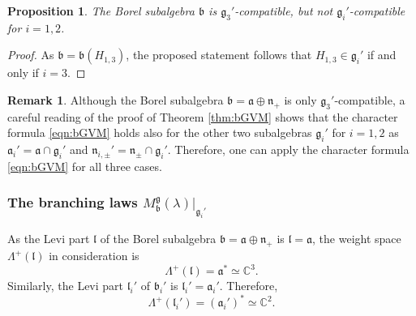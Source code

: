 \documentclass[a4paper,11pt,reqno]{amsart}
\newcommand{\fraka}{\mathfrak{a}}
\newcommand{\frakg}{\mathfrak{g}}
\newcommand{\frakn}{\mathfrak{n}}
\newcommand{\CC}{\mathbb{C}}
\newcommand{\0}{{\bf 0}}
\newcommand{\1}{{\bf 1}}
\newcommand{\frakb}{{\mathfrak b}}
\newcommand{\frakl}{{\mathfrak l}}
\newcommand{\Mb}{M^{\frakg}_{\frakb}}
\theoremstyle{plain}
\newtheorem{proposition}[equation]{Proposition}
\theoremstyle{definition}
\newtheorem{remark}[equation]{Remark}
\numberwithin{equation}{section}
\theoremstyle{definition}
\begin{document}
\begin{proposition}\label{prop:compatibility}
The Borel subalgebra $\frakb$ is $\frakg_3'$-compatible, but not 
$\frakg_i'$-compatible for $i=1,2$.
\end{proposition}

\begin{proof}
As $\frakb = \frakb(H_{1,3})$,
the proposed statement follows that 
$H_{1,3} \in \frakg_i'$ if and only if $i=3$.
\end{proof}

\begin{remark}\label{rem:compatibility}
Although the Borel subalgebra $\frakb=\fraka \oplus \frakn_+$ is only $\frakg_3'$-compatible,
a careful reading of the proof of Theorem \ref{thm:bGVM} shows
that the character formula \eqref{eqn:bGVM} holds also for the other 
two subalgebras $\frakg_i'$ for $i=1,2$
as $\fraka_i'=\fraka \cap \frakg_i'$ and 
$\frakn_{i,\pm}' = \frakn_{\pm}\cap \frakg_i'$. 
Therefore, one can apply the 
character formula \eqref{eqn:bGVM} for all three cases.
\end{remark}

\subsubsection{The branching laws \texorpdfstring{$\Mb(\lambda)\vert_{\frakg_i'}$}{M(λ)|_{g_i}}}
\label{sec:BranchingLaw_GL}

As the Levi part $\frakl$ of the Borel subalgebra
$\frakb=\fraka \oplus \frakn_+$ is $\frakl=\fraka$, the weight space
$\Lambda^+(\frakl)$ in consideration is 
\begin{equation*}
\Lambda^+(\frakl) = \fraka^* \simeq \CC^3.
\end{equation*}
Similarly, the Levi part $\frakl_i'$ of  $\frakb_i'$ 
is $\frakl_i' = \fraka_i'$. Therefore,
\begin{equation*}
\Lambda^+(\frakl_i') = (\fraka_i')^* \simeq \CC^2.
\end{equation*}
\end{document}
